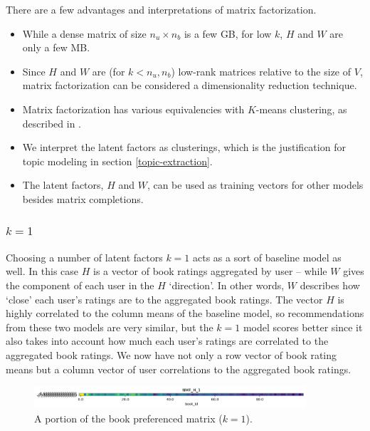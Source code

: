 \documentclass[11pt]{article}
\begin{document}
There are a few advantages and interpretations of matrix factorization.
\begin{itemize}
\item While a dense matrix of size $n_u \times n_b$ is a few GB, for low $k$, $H$ and $W$ are only a few MB.
\item Since $H$ and $W$ are (for $k < n_u, n_b$) low-rank matrices relative to the size of $V$, matrix factorization
can be considered a dimensionality reduction technique.
\item Matrix factorization has various equivalencies with $K$-means clustering, as described in \cite{dingEquivalenceNonnegativeMatrix2005}.
\item We interpret the latent factors as clusterings, which is the justification for topic modeling in section \ref{topic-extraction}.
\item The latent factors, $H$ and $W$, can be used as training vectors for other models besides matrix completions.
\end{itemize}








    \hypertarget{k1}{%
\subsubsection{\texorpdfstring{\(k=1\)}{k=1}}\label{k1}}




Choosing a number of latent factors \(k=1\) acts as a sort of baseline
model as well. In this case \(H\) is a vector of book ratings aggregated
by user -- while \(W\) gives the component of each user in the \(H\)
`direction'. In other words, \(W\) describes how `close' each user's
ratings are to the aggregated book ratings. The vector \(H\) is highly
correlated to the column means of the baseline model, so recommendations
from these two models are very similar, but the \(k=1\) model scores
better since it also takes into account how much each user's ratings are
correlated to the aggregated book ratings. We now have not only a row
vector of book rating means but a column vector of user correlations to
the aggregated book ratings.


\begin{figure}[b]
    \includegraphics[width=0.9\textwidth, trim=4cm 0cm 0cm 0cm, clip]{../image/goodreads-models/nmf-H-1.png}
    \caption[NMF-H-1]{A portion of the book preferenced matrix ($k=1$).}
     \label{fig:nmf-H-1}
\end{figure}
\end{document}
